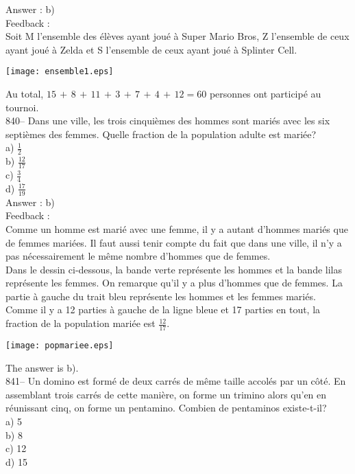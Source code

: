 ﻿\documentclass[letterpaper, 12pt]{article}
\begin{document}
Answer : b)\\

Feedback : \\
Soit M l'ensemble des \'el\`eves ayant jou\'e \`a Super Mario Bros,
Z l'ensemble de ceux ayant jou\'e \`a Zelda et S l'ensemble de ceux ayant
jou\'e \`a Splinter Cell.\\
    \begin{center}
    \texttt{[image: ensemble1.eps]}
    \end{center}
Au total, $15\,+\,8\,+\,11\,+\,3\,+\,7\,+\,4\,+\,12=60$ personnes ont
particip\'e au tournoi.\\

840-- Dans une ville, les trois cinqui\`emes des hommes sont mari\'es avec
les six septi\`emes des femmes.  Quelle fraction de la population adulte est
mari\'ee?\\
a) $\frac{1}{2}$\\ [2mm]
b) $\frac{12}{17}$\\[2mm]
c) $\frac{3}{4}$\\ [2mm]
d) $\frac{17}{19}$\\

Answer : b)\\

Feedback : \\
Comme un homme est mari\'e avec une femme, il y a autant d'hommes mari\'es
que de femmes mari\'ees.  Il faut aussi tenir compte du fait que dans une
ville, il n'y a pas n\'ecessairement le m\^eme nombre d'hommes que de
femmes.\\
Dans le dessin ci-dessous, la bande verte repr\'esente les hommes et la
bande lilas repr\'esente les femmes.  On remarque qu'il y a plus d'hommes
que de femmes.  La partie \`a gauche du trait bleu repr\'esente les hommes
et les femmes mari\'es.  Comme il y a 12 parties \`a gauche de la ligne
bleue et 17 parties en tout, la fraction de la population mari\'ee est
$\frac{12}{17}$.
    \begin{center}
    \texttt{[image: popmariee.eps]}
    \end{center}

The answer is b).\\

841-- Un domino est form\'e de deux carr\'es de m\^eme taille accol\'es par
un c\^ot\'e.  En assemblant trois carr\'es de cette mani\`ere, on forme un
trimino alors qu'en en r\'eunissant cinq, on forme un pentamino.  Combien de
pentaminos existe-t-il?\\
a) 5\\
b) 8\\
c) 12\\
d) 15\\
\end{document}
